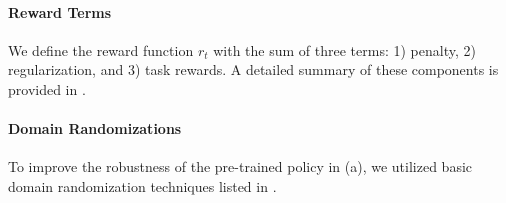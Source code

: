 \paragraph{Reward Terms}
We define the reward function $r_t$ with the sum of three terms: 1) penalty, 2) regularization, and 3) task rewards. A detailed summary of these components is provided in .

\paragraph{Domain Randomizations}
To improve the robustness of the pre-trained policy in  (a), we utilized basic domain randomization techniques listed in .
% 